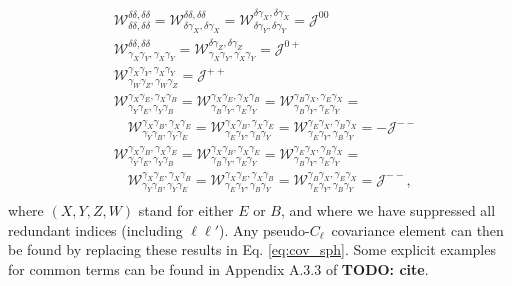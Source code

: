 \documentclass[a4paper,11pt]{article}
\newcommand{\todo}[1]{{\bf TODO: #1}}
\newcommand{\PCL}{pseudo-$C_\ell$~}
\begin{document}
      \begin{align}
        &\mathcal{W}^{\delta  \delta  ,\delta  \delta  }_{\delta  \delta  ,\delta  \delta  }=
         \mathcal{W}^{\delta  \delta  ,\delta  \delta  }_{\delta  \gamma_X,\delta  \gamma_X}=
         \mathcal{W}^{\delta  \gamma_X,\delta  \gamma_X}_{\delta  \gamma_Y,\delta  \gamma_Y}=\mathcal{J}^{00}\\
        &\mathcal{W}^{\delta  \delta  ,\delta  \delta  }_{\gamma_X\gamma_Y,\gamma_X\gamma_Y}=
         \mathcal{W}^{\delta  \gamma_Z,\delta  \gamma_Z}_{\gamma_X\gamma_Y,\gamma_X\gamma_Y}=\mathcal{J}^{0+}\\
        &\mathcal{W}^{\gamma_X\gamma_Y,\gamma_X\gamma_Y}_{\gamma_W\gamma_Z,\gamma_W\gamma_Z}=\mathcal{J}^{++}\\
        &\mathcal{W}^{\gamma_X\gamma_E,\gamma_X\gamma_B}_{\gamma_Y\gamma_E,\gamma_Y\gamma_B}=
         \mathcal{W}^{\gamma_X\gamma_E,\gamma_X\gamma_B}_{\gamma_B\gamma_Y,\gamma_E\gamma_Y}=
         \mathcal{W}^{\gamma_B\gamma_X,\gamma_E\gamma_X}_{\gamma_B\gamma_Y,\gamma_E\gamma_Y}=\\
        &\hspace{12pt}
         \mathcal{W}^{\gamma_X\gamma_B,\gamma_X\gamma_E}_{\gamma_Y\gamma_B,\gamma_Y\gamma_E}=
         \mathcal{W}^{\gamma_X\gamma_B,\gamma_X\gamma_E}_{\gamma_E\gamma_Y,\gamma_B\gamma_Y}=
         \mathcal{W}^{\gamma_E\gamma_X,\gamma_B\gamma_X}_{\gamma_E\gamma_Y,\gamma_B\gamma_Y}=-\mathcal{J}^{--}\\
        &\mathcal{W}^{\gamma_X\gamma_B,\gamma_X\gamma_E}_{\gamma_Y\gamma_E,\gamma_Y\gamma_B}=
         \mathcal{W}^{\gamma_X\gamma_B,\gamma_X\gamma_E}_{\gamma_B\gamma_Y,\gamma_E\gamma_Y}=
         \mathcal{W}^{\gamma_E\gamma_X,\gamma_B\gamma_X}_{\gamma_B\gamma_Y,\gamma_E\gamma_Y}=\\
        &\hspace{12pt}
         \mathcal{W}^{\gamma_X\gamma_E,\gamma_X\gamma_B}_{\gamma_Y\gamma_B,\gamma_Y\gamma_E}=
         \mathcal{W}^{\gamma_X\gamma_E,\gamma_X\gamma_B}_{\gamma_E\gamma_Y,\gamma_B\gamma_Y}=
         \mathcal{W}^{\gamma_B\gamma_X,\gamma_E\gamma_X}_{\gamma_E\gamma_Y,\gamma_B\gamma_Y}=\mathcal{J}^{--},\\
      \end{align}
      where $(X,Y,Z,W)$ stand for either $E$ or $B$, and where we have suppressed all redundant indices (including $\ell\ell'$). Any \PCL covariance element can then be found by replacing these results in Eq. \ref{eq:cov_sph}. Some explicit examples for common terms can be found in Appendix A.3.3 of \todo{cite}.
\end{document}
